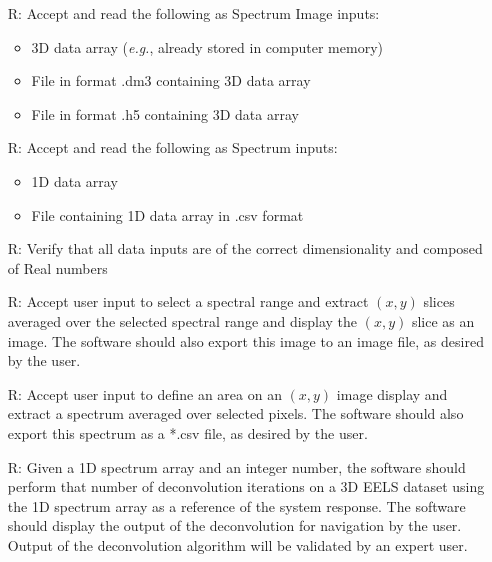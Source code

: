 \documentclass[12pt]{article}
\newcounter{reqnum} %
\begin{document}
\noindent \begin{itemize}

	\item[R\refstepcounter{reqnum}\thereqnum \label{R_SI_inputs}:] Accept and read the following as Spectrum Image inputs:
	
	\begin{itemize}
		\item 3D data array (\textit{e.g.}, already stored in computer memory)
		\item File in format .dm3 containing 3D data array
		\item File in format .h5 containing 3D data array
	\end{itemize}
	
	\item[R\refstepcounter{reqnum}\thereqnum \label{R_spectrum_inputs}:] Accept and read the following as Spectrum inputs:
	
	\begin{itemize}
		\item 1D data array
		\item File containing 1D data array in .csv format
	\end{itemize}

	\item[R\refstepcounter{reqnum}\thereqnum \label{R_Input_dimension}:] Verify that all data inputs are of the correct dimensionality and composed of Real numbers
	
	\item[R\refstepcounter{reqnum}\thereqnum \label{R_SI_slicing}:] Accept user input to select a spectral range and extract $(x,y)$ slices averaged over the selected spectral range and display the $(x,y)$ slice as an image. The software should also export this image to an image file, as desired by the user.
	
	\item[R\refstepcounter{reqnum}\thereqnum \label{R_SI_area}:] Accept user input to define an area on an $(x,y)$ image display and extract a spectrum averaged over selected pixels. The software should also export this spectrum as a *.csv file, as desired by the user.
	
	\item[R\refstepcounter{reqnum}\thereqnum \label{R_deconvolution}:] Given a 1D spectrum array and an integer number, the software should perform that number of deconvolution iterations on a 3D EELS dataset using the 1D spectrum array as a reference of the system response. The software should display the output of the deconvolution for navigation by the user. Output of the deconvolution algorithm will be validated by an expert user. 
	

\end{itemize}
\end{document}
